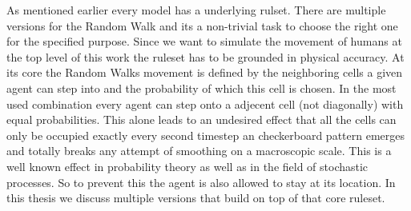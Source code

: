 As mentioned earlier every model has a underlying rulset. There are multiple versions for the Random Walk and its a non-trivial task to choose the right one for the specified purpose. 
Since we want to simulate the movement of humans at the top level of this work the ruleset has to be grounded in physical accuracy. 
At its core the Random Walks movement is defined by the neighboring cells a given agent can step into and the probability of which this cell is chosen. 
In the most used combination every agent can step onto a adjecent cell (not diagonally) with equal probabilities.
This alone leads to an undesired effect that all the cells can only be occupied exactly every second timestep an checkerboard pattern 
emerges and totally breaks any attempt of smoothing on a macroscopic scale. 
This is a well known effect in probability theory as well as in the field of stochastic processes.
So to prevent this the agent is also allowed to stay at its location. 
In this thesis we discuss multiple versions that build on top of that core ruleset. 

